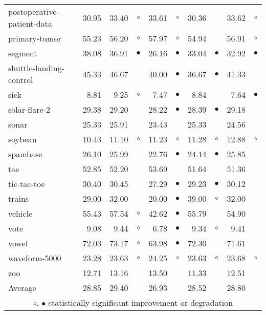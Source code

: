 \begin{table}[thb]
{\begin{tabular}{lrr@{\hspace{0.1cm}}cr@{\hspace{0.1cm}}cr@{\hspace{0.1cm}}cr@{\hspace{0.1cm}}c}
postoperative-patient-data & 30.95 & 33.40 &   $\circ$ & 33.61 &    $\circ$ & 30.36 &            & 33.62 &    $\circ$\\
primary-tumor & 55.23 & 56.20 &   $\circ$ & 57.97 &    $\circ$ & 54.94 &            & 56.91 &    $\circ$\\
segment & 38.08 & 36.91 & $\bullet$ & 26.16 &  $\bullet$ & 33.04 &  $\bullet$ & 32.92 &  $\bullet$\\
shuttle-landing-control & 45.33 & 46.67 &           & 40.00 &  $\bullet$ & 36.67 &  $\bullet$ & 41.33 &           \\
sick &  8.81 &  9.25 &   $\circ$ &  7.47 &  $\bullet$ &  8.84 &            &  7.64 &  $\bullet$\\
solar-flare-2 & 29.38 & 29.20 &           & 28.22 &  $\bullet$ & 28.39 &  $\bullet$ & 29.18 &           \\
sonar & 25.33 & 25.91 &           & 23.43 &            & 25.33 &            & 24.56 &           \\
soybean & 10.43 & 11.10 &   $\circ$ & 11.23 &    $\circ$ & 11.28 &    $\circ$ & 12.88 &    $\circ$\\
spambase & 26.10 & 25.99 &           & 22.76 &  $\bullet$ & 24.14 &  $\bullet$ & 25.85 &           \\
tae & 52.85 & 52.20 &           & 53.69 &            & 51.64 &            & 51.36 &           \\
tic-tac-toe & 30.40 & 30.45 &           & 27.29 &  $\bullet$ & 29.23 &  $\bullet$ & 30.12 &           \\
trains & 29.00 & 32.00 &           & 20.00 &  $\bullet$ & 39.00 &    $\circ$ & 32.00 &           \\
vehicle & 55.43 & 57.54 &   $\circ$ & 42.62 &  $\bullet$ & 55.79 &            & 54.90 &           \\
vote &  9.08 &  9.44 &   $\circ$ &  6.78 &  $\bullet$ &  9.34 &    $\circ$ &  9.41 &           \\
vowel & 72.03 & 73.17 &   $\circ$ & 63.98 &  $\bullet$ & 72.30 &            & 71.61 &           \\
waveform-5000 & 23.28 & 23.63 &   $\circ$ & 24.25 &    $\circ$ & 23.63 &    $\circ$ & 23.68 &    $\circ$\\
zoo & 12.71 & 13.16 &           & 13.50 &            & 11.33 &            & 12.51 &           \\
\hline
Average & 28.85 & 29.40 &           & 26.93 &            & 28.52 &            & 28.80 &           \\
\hline
\multicolumn{10}{c}{$\circ$, $\bullet$ statistically significant improvement or degradation}\\
\end{tabular} \footnotesize \par}
\end{table}